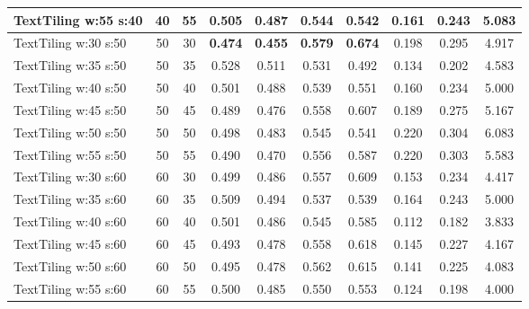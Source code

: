 \documentclass{article}
\begin{document}
\begin{longtable}[c]{|l|c|c|c|c|c|c|c|c|c|}
 TextTiling w:55 s:40 & 40 & 55 & 0.505 & 0.487 & 0.544 & 0.542 & 0.161 & 0.243 & 5.083  \\ \hline 
 TextTiling w:30 s:50 & 50 & 30 & \cellcolor{gray!20} \textbf{0.474} & \cellcolor{gray!20} \textbf{0.455} & \cellcolor{gray!20} \textbf{0.579} & \cellcolor{gray!20} \textbf{0.674} & 0.198 & 0.295 & 4.917  \\ \hline 
 TextTiling w:35 s:50 & 50 & 35 & 0.528 & 0.511 & 0.531 & 0.492 & 0.134 & 0.202 & 4.583  \\ \hline 
 TextTiling w:40 s:50 & 50 & 40 & 0.501 & 0.488 & 0.539 & 0.551 & 0.160 & 0.234 & 5.000  \\ \hline 
 TextTiling w:45 s:50 & 50 & 45 & 0.489 & 0.476 & 0.558 & 0.607 & 0.189 & 0.275 & 5.167  \\ \hline 
 TextTiling w:50 s:50 & 50 & 50 & 0.498 & 0.483 & 0.545 & 0.541 & 0.220 & 0.304 & 6.083  \\ \hline 
 TextTiling w:55 s:50 & 50 & 55 & 0.490 & 0.470 & 0.556 & 0.587 & 0.220 & 0.303 & 5.583  \\ \hline 
 TextTiling w:30 s:60 & 60 & 30 & 0.499 & 0.486 & 0.557 & 0.609 & 0.153 & 0.234 & 4.417  \\ \hline 
 TextTiling w:35 s:60 & 60 & 35 & 0.509 & 0.494 & 0.537 & 0.539 & 0.164 & 0.243 & 5.000  \\ \hline 
 TextTiling w:40 s:60 & 60 & 40 & 0.501 & 0.486 & 0.545 & 0.585 & 0.112 & 0.182 & 3.833  \\ \hline 
 TextTiling w:45 s:60 & 60 & 45 & 0.493 & 0.478 & 0.558 & 0.618 & 0.145 & 0.227 & 4.167  \\ \hline 
 TextTiling w:50 s:60 & 60 & 50 & 0.495 & 0.478 & 0.562 & 0.615 & 0.141 & 0.225 & 4.083  \\ \hline 
 TextTiling w:55 s:60 & 60 & 55 & 0.500 & 0.485 & 0.550 & 0.553 & 0.124 & 0.198 & 4.000  \\ \hline 
 \end{longtable} 
\newpage
\end{document}
